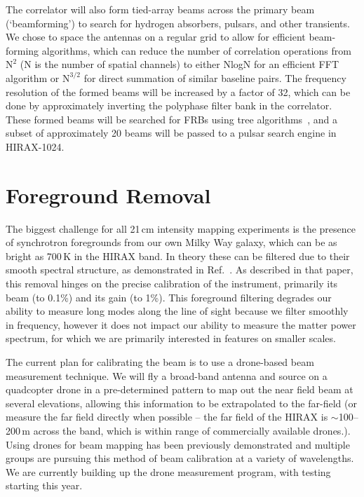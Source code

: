 \documentclass[]{spie}  %
\begin{document}
The correlator will also form tied-array beams across the primary beam (`beamforming') to search for hydrogen absorbers, pulsars, and other transients. We chose to space the antennas on a regular grid to allow for efficient beam-forming algorithms, which can reduce the number of correlation operations from $\mathrm{N}^{2}$ (N is the number of spatial channels) to either NlogN for an efficient FFT algorithm or $\mathrm{N}^{3/2}$ for direct summation of similar baseline pairs.  The frequency resolution of the formed beams will be increased by a factor of 32, which can be done by approximately inverting the polyphase filter bank in the correlator.  These formed beams will be searched for FRBs using tree algorithms~\cite{2015Natur.528..523M}, and a subset of approximately 20 beams will be passed to a pulsar search engine in HIRAX-1024.


\section{Foreground Removal}
\label{sec:chall}

The biggest challenge for all 21\,cm intensity mapping experiments is the presence of synchrotron foregrounds from our own Milky Way galaxy, which can be as bright as 700\,K in the HIRAX band. In theory these can be filtered due to their smooth spectral structure, as demonstrated in Ref.~\cite{2015PhRvD..91h3514S}. As described in that paper, this removal hinges on the precise calibration of the instrument, primarily its beam (to 0.1\%) and its gain (to 1\%). This foreground filtering degrades our ability to measure long modes along the line of sight because we filter smoothly in frequency, however it does not impact our ability to measure the matter power spectrum, for which we are primarily interested in features on smaller scales. \newline

The current plan for calibrating the beam is to use a drone-based beam measurement technique. We will fly a broad-band antenna and source on a quadcopter drone in a pre-determined pattern to map out the near field beam at several elevations, allowing this information to be extrapolated to the far-field (or measure the far field directly when possible -- the far field of the HIRAX is $\sim$100--200\,m across the band, which is within range of commercially available drones.). Using drones for beam mapping has been previously demonstrated \cite{2015PASP..127.1131C} and multiple groups are pursuing this method of beam calibration at a variety of wavelengths. We are currently building up the drone measurement program, with testing starting this year.\newline
\end{document}

